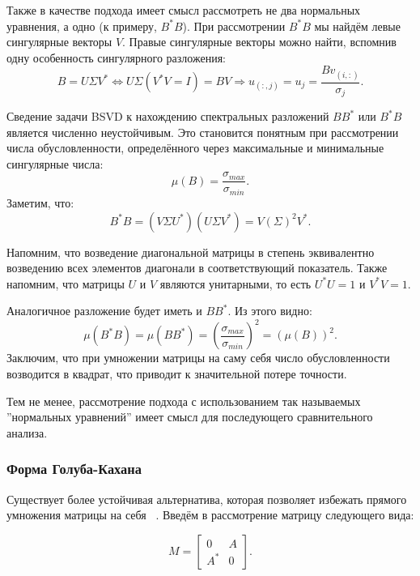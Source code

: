 Также в качестве подхода имеет смысл рассмотреть не два нормальных уравнения, а одно (к примеру, $B^*B$). При рассмотрении $B^*B$ мы найдём левые сингулярные векторы $V$. Правые сингулярные векторы можно найти, вспомнив одну особенность сингулярного разложения:
\begin{equation*}
     B=U \Sigma V^* \Leftrightarrow U\Sigma(V^*V=I)=BV \Rightarrow u_{(:,j)}=u_j= \frac{Bv_{(i,:)}}{\sigma_j}.
\end{equation*}


Сведение задачи BSVD к нахождению спектральных разложений \( B B^* \) или \( B^* B \) является численно неустойчивым. Это становится понятным при рассмотрении числа обусловленности, определённого через максимальные и минимальные сингулярные числа:
\[\mu(B) = \frac{\sigma_{max}}{\sigma_{min}}.\]
Заметим, что:
\[ B^*B=(V\Sigma U^*)(U \Sigma V^*)=V (\Sigma)^2 V^*. \]

\begin{note}
    Напомним, что возведение диагональной матрицы в степень эквивалентно возведению всех элементов диагонали в соответствующий показатель. Также напомним, что матрицы \(U\) и \(V\) являются унитарными, то есть \(U^*U=1\) и \(V^*V=1\).
\end{note}

Аналогичное разложение будет иметь и \(BB^*\). Из этого видно:
\[ \mu(B^*B) = \mu(BB^*) = \left( \frac{\sigma_{max}}{\sigma_{min}} \right)^2 =(\mu(B))^2.\]
Заключим, что при умножении матрицы на саму себя число обусловленности возводится в квадрат, что приводит к значительной потере точности. 

Тем не менее, рассмотрение подхода с использованием так называемых ''нормальных уравнений'' имеет смысл для последующего сравнительного анализа.

\subsubsection{Форма Голуба-Кахана}

Существует более устойчивая альтернатива, которая позволяет избежать прямого умножения матрицы на себя ~\cite{mr3_algo4triagonal_sym_eigen_and_bidiagSVD}. Введём в рассмотрение матрицу следующего вида:

\begin{equation}
M = \begin{bmatrix} 0 & A \\ A^* & 0 \end{bmatrix}.
\end{equation}

